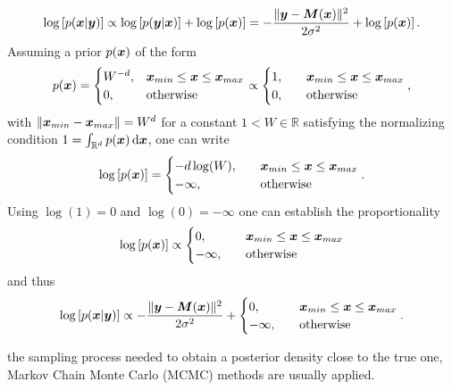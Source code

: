 \documentclass[a4paper,11pt]{report}
\def\lk#1{{\color{black}{#1}}}
\begin{document}
\begin{align}
\begin{aligned}
\log\left[p(\bm{x}|\bm{y})\right] \propto \log\left[p(\bm{y}|\bm{x})\right] + \log\left[p(\bm{x})\right] = -\frac{\|\bm{y}-\bm{M}(\bm{x}) \|^2}{2\sigma^2} + \log\left[p(\bm{x})\right].
\end{aligned}\end{align} Assuming a prior $p(\bm{x})$ of the form \begin{equation}
p(\bm{x}) = \begin{cases}
W^{-d}, &\bm{x}_{min} \leq \bm{x} \leq \bm{x}_{max} \\
0, \quad &\text{otherwise}
\end{cases} \propto \begin{cases}
1, &\bm{x}_{min} \leq \bm{x} \leq \bm{x}_{max} \\
0, \quad &\text{otherwise}
\end{cases},
\end{equation} with $\|\bm{x}_{min}-\bm{x}_{max}\| = W^d$ for a constant $1 < W \in \mathbb{R}$ satisfying the normalizing condition $1 = \int_{\mathbb{R}^d}p(\bm{x})\,\mathrm{d}\bm{x}$, one can write \begin{equation}
\log\left[p(\bm{x})\right] = \begin{cases} -d\log(W), \quad &\bm{x}_{min} \leq \bm{x} \leq \bm{x}_{max} \\
-\infty, \quad &\text{otherwise}  \end{cases}.
\end{equation} Using $\log(1) = 0$ and $\log(0) = -\infty$ one can establish the proportionality  \begin{equation}
\log\left[p(\bm{x})\right] \propto \begin{cases}
0, &\bm{x}_{min} \leq \bm{x} \leq \bm{x}_{max} \\
-\infty, \quad &\text{otherwise}
\end{cases}
\end{equation} and thus \begin{equation}
\log\left[p(\bm{x}|\bm{y})\right] \propto -\frac{\|\bm{y}-\bm{M}(\bm{x})\|^2}{2\sigma^2} + \begin{cases}
0, &\bm{x}_{min} \leq \bm{x} \leq \bm{x}_{max} \\
-\infty, \quad &\text{otherwise}
\end{cases}.
\end{equation}

\lk{For} the sampling process needed to obtain a posterior density close to the true one, Markov Chain Monte Carlo (MCMC) methods are usually applied.
\end{document}
